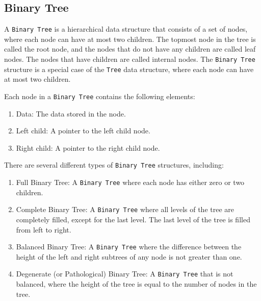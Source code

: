 \subsection{Binary Tree}
A \lstinline{Binary Tree} is a hierarchical data structure that consists of a set of nodes, where each node can have at most two children. The topmost node in the tree is called the root node, and the nodes that do not have any children are called leaf nodes. The nodes that have children are called internal nodes. The \lstinline{Binary Tree} structure is a special case of the \lstinline{Tree} data structure, where each node can have at most two children.

Each node in a \lstinline{Binary Tree} contains the following elements:
\begin{enumerate}
    \item Data: The data stored in the node.
    \item Left child: A pointer to the left child node.
    \item Right child: A pointer to the right child node.
\end{enumerate}

There are several different types of \lstinline{Binary Tree} structures, including:
\begin{enumerate}
    \item Full Binary Tree: A \lstinline{Binary Tree} where each node has either zero or two children.
    \item Complete Binary Tree: A \lstinline{Binary Tree} where all levels of the tree are completely filled, except for the last level. The last level of the tree is filled from left to right.
    \item Balanced Binary Tree: A \lstinline{Binary Tree} where the difference between the height of the left and right subtrees of any node is not greater than one.
    \item Degenerate (or Pathological) Binary Tree: A \lstinline{Binary Tree} that is not balanced, where the height of the tree is equal to the number of nodes in the tree.
\end{enumerate}


